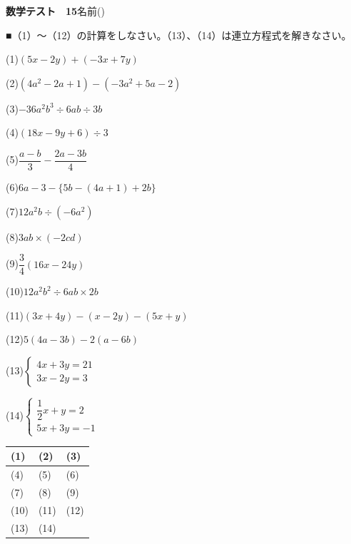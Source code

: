 \documentclass[a4paper,11pt]{ltjsarticle}
\newlength{\qcol}\setlength{\qcol}{0.47\textwidth}
\newlength{\qgap}
\newlength{\anscolw}\setlength{\anscolw}{0.30\textwidth}
\newlength{\ansh}
\newcommand{\Q}[2]{\parbox[t]{\qcol}{\raggedright (#1)\hspace{0.6em}$\displaystyle #2$}}
\newcommand{\QR}[4]{\Q{#1}{#2}\hfill\Q{#3}{#4}\par\vspace{\qgap}}
\newcommand{\anscell}[1]{\rule[-\ansdrop]{0pt}{\ansh}(#1)}
\newlength{\ansdrop}
\begin{document}
{\large\bfseries 数学テスト　15}\hfill 名前(\underline{\hspace{32mm}})\par\vspace{3mm}
■（1）〜（12）の計算をしなさい。（13）、（14）は連立方程式を解きなさい。\par\vspace{3mm}
\setlength{\qgap}{11mm}
\QR{1}{(5x-2y)+(-3x+7y)}{2}{(4a^2-2a+1)-(-3a^2+5a-2)}
\QR{3}{-36a^2b^3\div6ab\div3b}{4}{(18x-9y+6)\div3}
\QR{5}{\dfrac{a-b}{3}-\dfrac{2a-3b}{4}}{6}{6a-3-\{5b-(4a+1)+2b\}}
\QR{7}{12a^2b\div(-6a^2)}{8}{3ab\times(-2cd)}
\QR{9}{\dfrac{3}{4}(16x-24y)}{10}{12a^2b^2\div6ab\times2b}
\QR{11}{(3x+4y)-(x-2y)-(5x+y)}{12}{5(4a-3b)-2(a-6b)}
\QR{13}{\left\{\begin{array}{l} 4x+3y=21 \\ 3x-2y=3 \end{array}\right.}{14}{\left\{\begin{array}{l} \dfrac{1}{2}x+y=2 \\ 5x+3y=-1 \end{array}\right.}
\vfill
\setlength{\ansh}{12mm}\setlength{\ansdrop}{8mm}%
\begin{center}\begin{tabular}{|p{\anscolw}|p{\anscolw}|p{\anscolw}|}\hline
\anscell{1} & \anscell{2} & \anscell{3} \\\hline
\anscell{4} & \anscell{5} & \anscell{6} \\\hline
\anscell{7} & \anscell{8} & \anscell{9} \\\hline
\anscell{10} & \anscell{11} & \anscell{12} \\\hline
\anscell{13} & \anscell{14} &  \\\hline
\end{tabular}\end{center}
\end{document}
